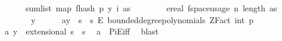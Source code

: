 \begin{isabellebody}
\ \ \ \ \ \ sum{\isacharunderscore}{\kern0pt}list\ {\isacharparenleft}{\kern0pt}map\ {\isacharparenleft}{\kern0pt}f{}{\isacharunderscore}{\kern0pt}hash\ p\ {\isacharparenleft}{\kern0pt}y\ i{\isacharparenright}{\kern0pt}{\isacharparenright}{\kern0pt}\ as{\isacharparenright}{\kern0pt}{\isacharparenright}{\kern0pt}{\isacharparenright}{\kern0pt}\isanewline
\ \ \ \ \ \ \ {\isasymle}\ ereal\ {\isacharparenleft}{\kern0pt}f{}{\isacharunderscore}{\kern0pt}space{\isacharunderscore}{\kern0pt}usage\ {\isacharparenleft}{\kern0pt}n{\isacharcomma}{\kern0pt}\ length\ as{\isacharcomma}{\kern0pt}\ {\isasymepsilon}{\isacharcomma}{\kern0pt}\ {\isasymdelta}{\isacharparenright}{\kern0pt}{\isacharparenright}{\kern0pt}{\isachardoublequoteclose}\isanewline
\ \ \isamarkupfalse%
\ {\isacharminus}{\kern0pt}\isanewline
\ \ \ \ \isamarkupfalse%
\ y\isanewline
\ \ \ \ \isamarkupfalse%
\ a{\isacharunderscore}{\kern0pt}{}{\isacharcolon}{\kern0pt}{\isachardoublequoteopen}y\ {\isasymin}\ {\isacharbraceleft}{\kern0pt}{}{\isachardot}{\kern0pt}{\isachardot}{\kern0pt}{\isacharless}{\kern0pt}s\ {\isasymtimes}\ {\isacharbraceleft}{\kern0pt}{}{\isachardot}{\kern0pt}{\isachardot}{\kern0pt}{\isacharless}{\kern0pt}s\ {\isasymrightarrow}\isactrlsub E\ bounded{\isacharunderscore}{\kern0pt}degree{\isacharunderscore}{\kern0pt}polynomials\ {\isacharparenleft}{\kern0pt}ZFact\ {\isacharparenleft}{\kern0pt}int\ p{\isacharparenright}{\kern0pt}{\isacharparenright}{\kern0pt}\ {}{\isachardoublequoteclose}\isanewline
\isanewline
\ \ \ \ \isamarkupfalse%
\ a{\isacharunderscore}{\kern0pt}{}{\isacharcolon}{\kern0pt}\ {\isachardoublequoteopen}y\ {\isasymin}\ extensional\ {\isacharparenleft}{\kern0pt}{\isacharbraceleft}{\kern0pt}{}{\isachardot}{\kern0pt}{\isachardot}{\kern0pt}{\isacharless}{\kern0pt}s\ {\isasymtimes}\ {\isacharbraceleft}{\kern0pt}{}{\isachardot}{\kern0pt}{\isachardot}{\kern0pt}{\isacharless}{\kern0pt}s\ \isamarkupfalse%
\ a{\isacharunderscore}{\kern0pt}{}\ \ PiE{\isacharunderscore}{\kern0pt}iff\ \isamarkupfalse%
\ blast\isanewline
\isanewline
\ \ \ \ \isamarkupfalse%

\end{isabellebody}
